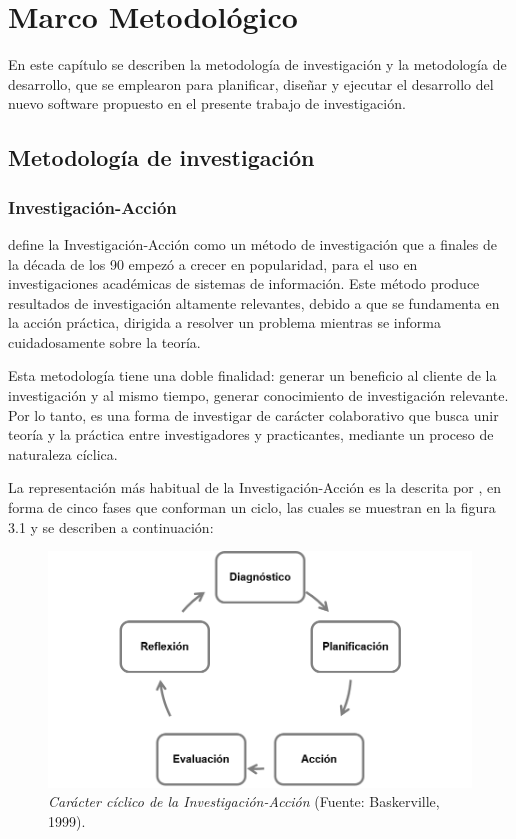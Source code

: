 \chapter{Marco Metodol\'{o}gico}
	
	En este cap\'{i}tulo se describen la metodolog\'{i}a de investigaci\'{o}n y la metodolog\'{i}a de desarrollo, que se emplearon para planificar, dise\~{n}ar y ejecutar el desarrollo del nuevo software propuesto en el presente trabajo de investigaci\'{o}n.
	
	\section{Metodolog\'{i}a de investigaci\'{o}n}
	
		\subsection{Investigaci\'{o}n-Acci\'{o}n}
	\cite{Baskerville} define la Investigaci\'{o}n-Acci\'{o}n como un m\'{e}todo de investigaci\'{o}n que a finales de la d\'{e}cada de los 90 empez\'{o} a crecer en popularidad, para el uso en investigaciones acad\'{e}micas de sistemas de informaci\'{o}n. Este m\'{e}todo produce resultados de investigaci\'{o}n altamente relevantes, debido a que se fundamenta en la acci\'{o}n pr\'{a}ctica, dirigida a resolver un problema mientras se informa cuidadosamente sobre la teor\'{i}a.

	Esta metodolog\'{i}a tiene una doble finalidad: generar un beneficio al cliente de la investigaci\'{o}n y al mismo tiempo, generar conocimiento de investigaci\'{o}n relevante. Por lo tanto, es una forma de investigar de car\'{a}cter colaborativo que busca unir teor\'{i}a y la pr\'{a}ctica entre investigadores y practicantes, mediante un proceso de naturaleza c\'{i}clica.

	La representaci\'{o}n m\'{a}s habitual de la Investigaci\'{o}n-Acci\'{o}n es la descrita por \cite{Baskerville}, en forma de cinco fases que conforman un ciclo, las cuales se muestran en la figura 3.1 y se describen a continuaci\'{o}n:

	\begin{figure}
		\centering
		\includegraphics[scale=0.8]{img/investigacion-accion.png}
			\caption[Car\'{a}cter c\'{i}clico de la Investigaci\'{o}n-Acci\'{o}n]{\textit{Car\'{a}cter c\'{i}clico de la Investigaci\'{o}n-Acci\'{o}n} (Fuente: Baskerville, 1999).}
	\end{figure}

